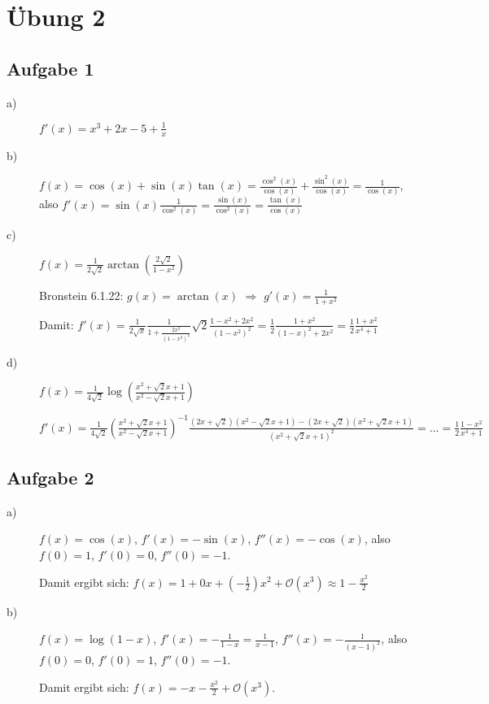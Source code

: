 \chapter*{Übung 2}

\section*{Aufgabe 1}

\begin{description}
	\item[a)] $f'(x) = x^3 + 2x - 5 + \frac{1}{x}$
	\item[b)] $f(x) = \cos(x) + \sin(x) \tan(x) = \frac{\cos^2(x)}{\cos(x)} + \frac{\sin^2(x)}{\cos(x)} = \frac{1}{\cos(x)}$, also $f'(x) =\sin(x) \frac{1}{\cos^2(x)} = \frac{\sin(x)}{\cos^2(x)} = \frac{\tan(x)}{\cos(x)}$
	\item[c)] $f(x) = \frac{1}{2 \sqrt{2}} \arctan\left( \frac{2 \sqrt{2}}{1 - x^2} \right)$
	
	Bronstein 6.1.22: $g(x) = \arctan(x)$ $\Rightarrow$ $g'(x) = \frac{1}{1 + x^2}$
	
	Damit: $f'(x) 
	= \frac{1}{2 \sqrt{x}} \frac{1}{1 + \frac{2x^2}{(1 - x^2)^2}} \sqrt{2} \frac{1 - x^2 + 2x^2}{(1 - x^2)^2}
	= \frac{1}{2} \frac{1 + x^2}{(1 - x)^2 + 2x^2}
	= \frac{1}{2} \frac{1 + x^2}{x^4 + 1}$
	
	\item[d)] $f(x) = \frac{1}{4 \sqrt{2}} \log \left( \frac{x^2 + \sqrt{2} x + 1}{x^2 - \sqrt{2}x + 1} \right)$
	
	$f'(x) 
	= \frac{1}{4 \sqrt{2}} \left( \frac{x^2 + \sqrt{2}x + 1}{x^2 - \sqrt{2}x + 1} \right)^{-1} \frac{(2x + \sqrt{2})(x^2 - \sqrt{2}x + 1)-(2x + \sqrt{2})(x^2 + \sqrt{2}x + 1)}{(x^2 + \sqrt{2}x + 1)^2}
	= \dots 
	= \frac{1}{2} \frac{1 - x^2}{x^4 + 1}$
\end{description}

\section*{Aufgabe 2}

\begin{description}
	\item[a)] $f(x) = \cos(x)$, $f'(x) = -\sin(x)$, $f''(x) = -\cos(x)$, also $f(0) = 1$, $f'(0) = 0$, $f''(0) = -1$.
	
	Damit ergibt sich: $f(x) = 1 + 0 x + \left( -\frac{1}{2} \right)x^2 + \mathcal{O}(x^3) \approx 1 - \frac{x^2}{2}$
	
	\item[b)] $f(x) = \log(1 - x)$, $f'(x) = -\frac{1}{1 - x} = \frac{1}{x - 1}$, $f''(x) = -\frac{1}{(x - 1)^2}$, also $f(0) = 0$, $f'(0) = 1$, $f''(0) = -1$.
	
	Damit ergibt sich: $f(x) = -x - \frac{x^2}{2} + \mathcal{O}(x^3)$.
\end{description}

